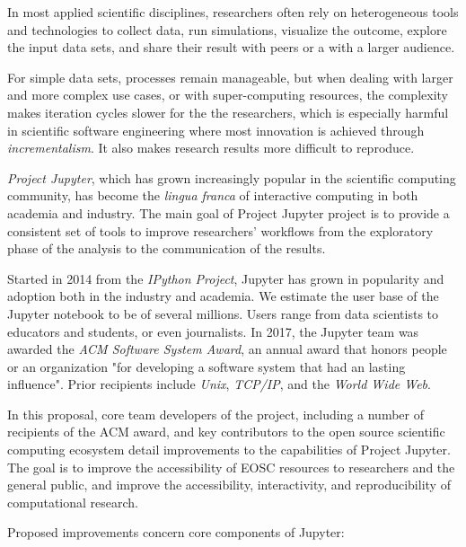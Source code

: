 In most applied scientific disciplines, researchers often rely on heterogeneous tools and technologies to collect data, run simulations, visualize the outcome, explore the input data sets, and share their result with peers or a with a larger audience.

For simple data sets, processes remain manageable, but when dealing with larger and more complex use cases, or with super-computing resources, the complexity makes iteration cycles slower for the the researchers, which is especially harmful in scientific software engineering where most innovation is achieved through \emph{incrementalism}. It also makes research results more difficult to reproduce.

\emph{Project Jupyter}, which has grown increasingly popular in the scientific computing community, has become the \emph{lingua franca} of interactive computing in both academia and industry. The main goal of Project Jupyter project is to provide a consistent set of tools to improve researchers' workflows from the exploratory phase of the analysis to the communication of the results.

Started in 2014 from the \emph{IPython Project}, Jupyter has grown in popularity and adoption both in the industry and academia. We estimate the user base of the Jupyter notebook to be of several millions. Users range from data scientists to educators and students, or even journalists. In 2017, the Jupyter team was awarded the \emph{ACM Software System Award}, an annual award that honors people or an organization "for developing a software system that had an lasting influence". Prior recipients include \emph{Unix}, \emph{TCP/IP}, and the \emph{World Wide Web}.

In this proposal, core team developers of the project, including a number of recipients of the ACM award, and key contributors to the open source scientific computing ecosystem detail improvements to the capabilities of Project Jupyter. The goal is to improve the accessibility of EOSC resources to researchers and the general public, and improve the accessibility, interactivity, and reproducibility of computational research.

Proposed improvements concern core components of Jupyter:


